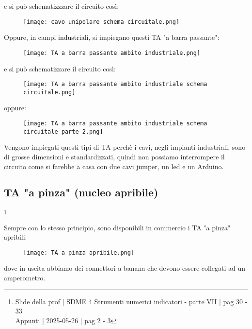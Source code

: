 e si può schematizzzare il circuito così: 

\begin{figure}[h]
    \centering
    \texttt{[image: cavo unipolare schema circuitale.png]}
\end{figure}

Oppure, in campi industriali, si impiegano questi TA "a barra passante": 

\begin{figure}[h]
    \centering
    \texttt{[image: TA a barra passante ambito industriale.png]}
\end{figure}

\newpage 

e si può schematizzare il circuito così: 

\begin{figure}[h]
    \centering
    \texttt{[image: TA a barra passante ambito industriale schema circuitale.png]}
\end{figure}

oppure: 

\begin{figure}[h]
    \centering
    \texttt{[image: TA a barra passante ambito industriale schema circuitale parte 2.png]}
\end{figure}

Vengono impiegati questi tipi di TA perchè i cavi, negli impianti industriali, sono di grosse dimensioni e standardizzati, 
quindi non possiamo interrompere il circuito come si farebbe a casa con due cavi jumper, un led e un Arduino. \newline 

\newpage

\subsection{TA "a pinza" (nucleo apribile) }
\footnote{Slide della prof | SDME 4 Strumenti numerici indicatori - parte VII | pag 30 - 33\\  
Appunti | 2025-05-26 | pag 2 - 3}

Sempre con lo stesso principio, sono disponibili in commercio i TA "a pinza" apribili: 

\begin{figure}[h]
    \centering
    \texttt{[image: TA a pinza apribile.png]}
\end{figure}

dove in uscita abbiamo dei connettori a banana che devono essere collegati ad un amperometro. \newline 

